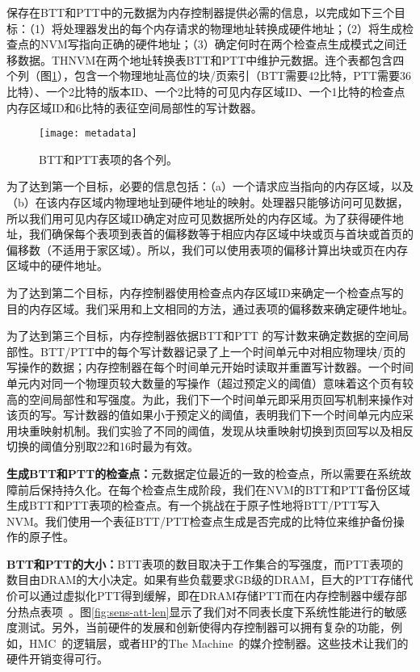 保存在BTT和PTT中的元数据为内存控制器提供必需的信息，以完成如下三个目标：（1）将处理器发出的每个内存请求的物理地址转换成硬件地址；（2）将生成检查点的NVM写指向正确的硬件地址；（3）确定何时在两个检查点生成模式之间迁移数据。THNVM在两个地址转换表BTT和PTT中维护元数据。连个表都包含四个列（图\ref{fig:metadata}），包含一个物理地址高位的块/页索引（BTT需要42比特，PTT需要36比特）、一个2比特的版本ID、一个2比特的可见内存区域ID、一个1比特的检查点内存区域ID和6比特的表征空间局部性的写计数器。 

\begin{figure}[!ht]
\centering
\texttt{[image: metadata]}
\caption{BTT和PTT表项的各个列。}
\label{fig:metadata}
\end{figure}

为了达到第一个目标，必要的信息包括：（a）一个请求应当指向的内存区域，以及（b）在该内存区域内物理地址到硬件地址的映射。处理器只能够访问可见数据，所以我们用可见内存区域ID确定对应可见数据所处的内存区域。为了获得硬件地址，我们确保每个表项到表首的偏移数等于相应内存区域中块或页与首块或首页的偏移数（不适用于家区域）。所以，我们可以使用表项的偏移计算出块或页在内存区域中的硬件地址。 

为了达到第二个目标，内存控制器使用检查点内存区域ID来确定一个检查点写的目的内存区域。我们采用和上文相同的方法，通过表项的偏移数来确定硬件地址。 

为了达到第三个目标，内存控制器依据BTT和PTT 的写计数来确定数据的空间局部性。BTT/PTT中的每个写计数器记录了上一个时间单元中对相应物理块/页的写操作的数据；内存控制器在每个时间单元开始时读取并重置写计数器。一个时间单元内对同一个物理页较大数量的写操作（超过预定义的阈值）意味着这个页有较高的空间局部性和写强度。为此，我们下一个时间单元即采用页回写机制来操作对该页的写。写计数器的值如果小于预定义的阈值，表明我们下一个时间单元内应采用块重映射机制。我们实验了不同的阈值，发现从块重映射切换到页回写以及相反切换的阈值分别取22和16时最为有效。
 
\textbf{生成BTT和PTT的检查点：}元数据定位最近的一致的检查点，所以需要在系统故障前后保持持久化。在每个检查点生成阶段，我们在NVM的BTT和PTT备份区域生成BTT和PTT表项的检查点。有一个挑战在于原子性地将BTT/PTT写入NVM。我们使用一个表征BTT/PTT检查点生成是否完成的比特位来维护备份操作的原子性。 

\textbf{BTT和PTT的大小：}BTT表项的数目取决于工作集合的写强度，而PTT表项的数目由DRAM的大小决定。如果有些负载要求GB级的DRAM，巨大的PTT存储代价可以通过虚拟化PTT得到缓解，即在DRAM存储PTT而在内存控制器中缓存部分热点表项~\cite{Meza2012, Yoon2010, Burcea2008}。图\ref{fig:sens-att-len}显示了我们对不同表长度下系统性能进行的敏感度测试。另外，当前硬件的发展和创新使得内存控制器可以拥有复杂的功能，例如，HMC~\cite{HMC:2011}的逻辑层，或者HP的The Machine~\cite{TheMachine:2015}的媒介控制器。这些技术让我们的硬件开销变得可行。

